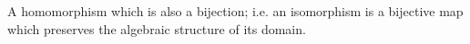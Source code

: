 A homomorphism which is also a bijection; i.e. an isomorphism is
a bijective map which preserves the algebraic structure of its domain.